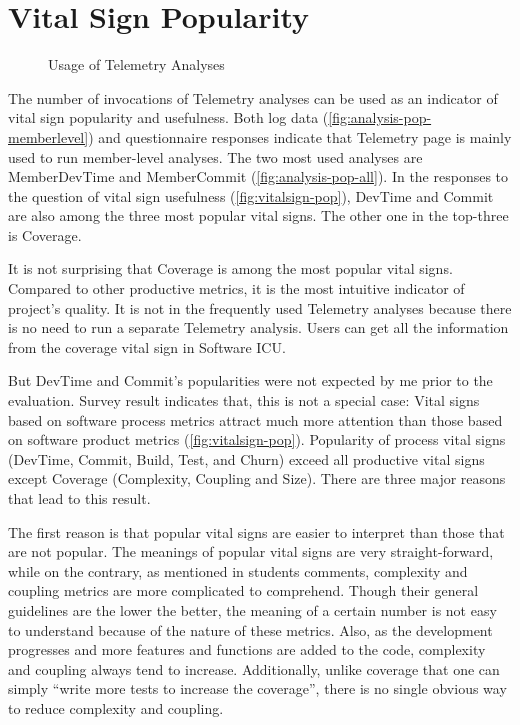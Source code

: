 \section {Vital Sign Popularity}

\begin{figure}[htbp] %
   \centering     
   \vspace{.3in}
   \caption{Usage of Telemetry Analyses}
   \label{fig:analysis-pop}
\end{figure}

The number of invocations of Telemetry analyses can be used as an indicator of vital sign popularity and usefulness. Both log data (\autoref{fig:analysis-pop-memberlevel}) and questionnaire responses indicate that Telemetry page is mainly used to run member-level analyses. The two most used analyses are MemberDevTime and MemberCommit (\autoref{fig:analysis-pop-all}). In the responses to the question of vital sign usefulness (\autoref{fig:vitalsign-pop}), DevTime and Commit are also among the three most popular vital signs. The other one in the top-three is Coverage. 

It is not surprising that Coverage is among the most popular vital signs. Compared to other productive metrics, it is the most intuitive indicator of project's quality. It is not in the frequently used Telemetry analyses because there is no need to run a separate Telemetry analysis. Users can get all the information from the coverage vital sign in Software ICU.

But DevTime and Commit's popularities were not expected by me prior to the evaluation. Survey result indicates that, this is not a special case: Vital signs based on software process metrics attract much more attention than those based on software product metrics (\autoref{fig:vitalsign-pop}). Popularity of process vital signs (DevTime, Commit, Build, Test, and Churn) exceed all productive vital signs except Coverage (Complexity, Coupling and Size). There are three major reasons that lead to this result. 

The first reason is that popular vital signs are easier to interpret than those that are not popular. The meanings of popular vital signs are very straight-forward, while on the contrary, as mentioned in students comments, complexity and coupling metrics are more complicated to comprehend. Though their general guidelines are the lower the better, the meaning of a certain number is not easy to understand because of the nature of these metrics. Also, as the development progresses and more features and functions are added to the code, complexity and coupling always tend to increase. Additionally, unlike coverage that one can simply ``write more tests to increase the coverage'', there is no single obvious way to reduce complexity and coupling. 

